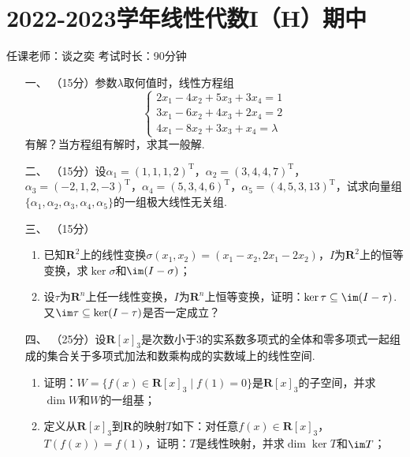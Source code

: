 \section*{2022-2023学年线性代数I（H）期中}
\label{sec:2022-2023-1midtzy}

\begin{center}
    任课老师：谈之奕\hspace{4em} 考试时长：90分钟
\end{center}
\begin{enumerate}
	\item[一、]（15分）参数$\lambda$取何值时，线性方程组
	\[\begin{cases}
        2x_1-4x_2+5x_3+3x_4=1 \\
        3x_1-6x_2+4x_3+2x_4=2 \\
        4x_1-8x_2+3x_3+x_4=\lambda
    \end{cases}\]
    有解？当方程组有解时，求其一般解.
	\item[二、]（15分）设$\alpha_1=(1,1,1,2)^\mathrm{T}$，$\alpha_2=(3,4,4,7)^\mathrm{T}$，$\alpha_3=(-2,1,2,-3)^\mathrm{T}$，$\alpha_4=(5,3,4,6)^\mathrm{T}$，$\alpha_5=(4,5,3,13)^\mathrm{T}$，试求向量组$\{\alpha_1,\alpha_2,\alpha_3,\alpha_4,\alpha_5\}$的一组极大线性无关组.
	\item[三、]（15分）
    \begin{enumerate}[label=(\arabic*)]
        \item 已知$\mathbf{R}^2$上的线性变换$\sigma(x_1,x_2)=(x_1-x_2,2x_1-2x_2)$，$I$为$\mathbf{R}^2$上的恒等变换，求$\ker\sigma$和$\im(I-\sigma)$；

        \item 设$\tau$为$\mathbf{R}^n$上任一线性变换，$I$为$\mathbf{R}^n$上恒等变换，证明：$\ker\tau\subseteq\im(I-\tau)$. 又$\im\tau\subseteq\ker(I-\tau)$是否一定成立？
    \end{enumerate}
	\item[四、]（25分）设$\mathbf{R}[x]_3$是次数小于3的实系数多项式的全体和零多项式一起组成的集合关于多项式加法和数乘构成的实数域上的线性空间.
	\begin{enumerate}[label=(\arabic*)]
        \item 证明：$W=\{f(x)\in\mathbf{R}[x]_3\mid f(1)=0\}$是$\mathbf{R}[x]_3$的子空间，并求$\dim W$和$W$的一组基；

        \item 定义从$\mathbf{R}[x]_3$到$\mathbf{R}$的映射$T$如下：对任意$f(x)\in\mathbf{R}[x]_3$，$T(f(x))=f(1)$，证明：$T$是线性映射，并求$\dim\ker T$和$\im T$；


\end{enumerate}
\end{enumerate}
